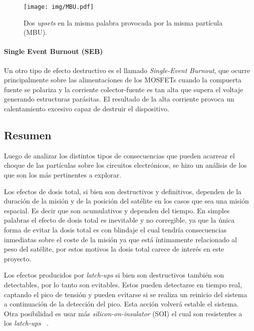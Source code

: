 \documentclass[a4paper,openright,12pt]{report}
\begin{document}
\begin{figure}[H]
	\centering
	\texttt{[image: img/MBU.pdf]}
	\caption{Dos \textit{upsets} en la misma palabra provocada por la misma partícula (MBU).}
	\label{MBU}
\end{figure}

\paragraph{Single Event Burnout (SEB)   } \hfill \break
Un otro tipo de efecto destructivo es el llamado \textit{Single-Event Burnout}, que ocurre principalmente sobre las alimentaciones de los MOSFETs cuando la compuerta fuente se polariza y la corriente colector-fuente es tan alta que supera el voltaje generando estructuras parásitas. El resultado de la alta corriente provoca un calentamiento excesivo capaz de destruir el dispositivo.

\subsection{Resumen}


Luego de analizar los distintos tipos de consecuencias que pueden acarrear el choque de las partículas sobre los circuitos electrónicos, se hizo un análisis de los que son los más pertinentes a explorar.

Los efectos de dosis total, si bien son destructivos y definitivos, dependen de la duración de la misión y de la posición del satélite en los casos que sea una misión espacial. Es decir que son acumulativos y dependen del tiempo. 
En simples palabras el efecto de dosis total es inevitable y no corregible, ya que la única forma de evitar la dosis total es con blindaje el cual tendría consecuencias inmediatas sobre el coste de la misión ya que está íntimamente relacionado al peso del satélite, por estos motivos la dosis total  carece de interés en este proyecto.

Los efectos producidos por \textit{latch-ups} si bien son destructivos también son detectables, por lo tanto son evitables. Estos pueden detectarse en tiempo real, captando el pico de tensión y pueden evitarse si se realiza  un reinicio del sistema a continuación de la detección del pico. Esta acción  volverá estable el sistema.
Otra posibilidad es usar más \textit{silicon-on-insulator} (SOI) el cual son resistentes a los \textit{latch-ups} ~\cite{340569}.
\end{document}
